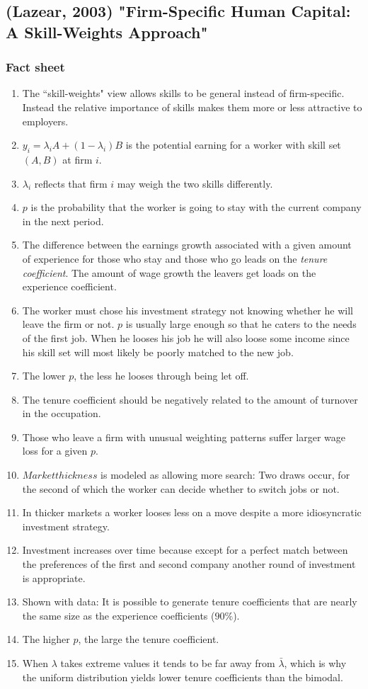 \documentclass[12pt,a4paper]{article}
\begin{document}
  \subsection{(Lazear, 2003) "Firm-Specific Human Capital: A Skill-Weights Approach"} %
  \subsubsection{Fact sheet} %
  \begin{enumerate}
    \item The ``skill-weights" view allows skills to be general instead of firm-specific. Instead the relative importance of skills makes them more or less attractive to employers.
    \item $y_i = \lambda_i A+(1-\lambda_i)B$ is the potential earning for a worker with skill set $(A, B)$ at firm $i$.
    \item $\lambda_i$ reflects that firm $i$ may weigh the two skills differently.
    \item $p$ is the probability that the worker is going to stay with the current company in the next period.
    \item The difference between the earnings growth associated with a given amount of experience for those who stay and those who go leads on the \emph{tenure coefficient}. The amount of wage growth the leavers get loads on the experience coefficient.
    \item The worker must chose his investment strategy not knowing whether he will leave the firm or not. $p$ is usually large enough so that he caters to the needs of the first job. When he looses his job he will also loose some income since his skill set will most likely be poorly matched to the new job.
    \item The lower $p$, the less he looses through being let off.
    \item The tenure coefficient should be negatively related to the amount of turnover in the occupation.
    \item Those who leave a firm with unusual weighting patterns suffer larger wage loss for a given $p$.
    \item $Market thickness$ is modeled as allowing more search: Two draws occur, for the second of which the worker can decide whether to switch jobs or not.
    \item In thicker markets a worker looses less on a move despite a more idiosyncratic investment strategy.
	\item Investment increases over time because except for a perfect match between the preferences of the first and second company another round of investment is appropriate.
	\item Shown with data: It is possible to generate tenure coefficients that are nearly the same size as the experience coefficients ($90\%$).
	\item The higher $p$, the large the tenure coefficient.
	\item When $\lambda$ takes extreme values it tends to be far away from $\bar{\lambda}$, which is why the uniform distribution yields lower tenure coefficients than the bimodal.
  \end{enumerate}
\end{document}
